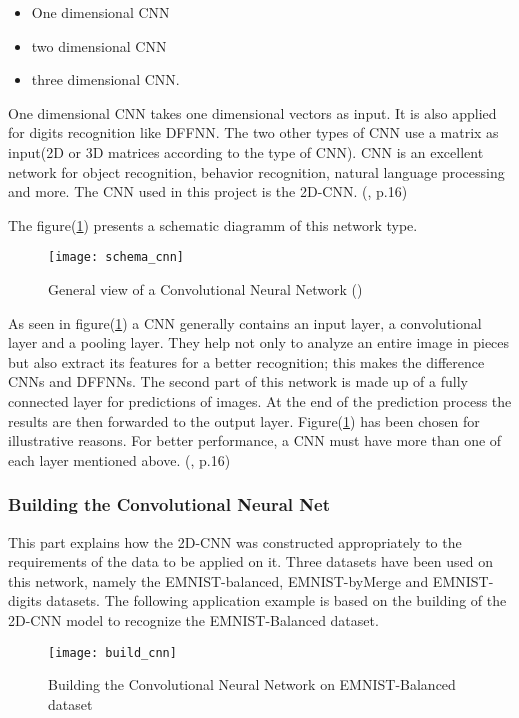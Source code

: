 \begin{itemize}
    \item One dimensional CNN
    \item two dimensional CNN
    \item three dimensional CNN.
  \end{itemize}

One dimensional CNN takes one dimensional vectors as input. 
It is also applied for digits recognition like DFFNN. The two other types of CNN use a matrix as input(2D or 3D matrices according to the type of CNN).
CNN is an excellent network for object recognition, behavior recognition, natural language processing and more. 
The CNN used in this project is the 2D-CNN. (\cite{[1]}, p.16)

The figure(\ref{Abb:schema_cnn}) presents a schematic diagramm of this network type.
\begin{figure}[htb]
	\centering
	\texttt{[image: schema\_cnn]}
	\caption[Convolutional Neural Network]{General view of a Convolutional Neural Network (\cite{[14]})} \label{Abb:schema_cnn}
\end{figure}

As seen in figure(\ref{Abb:schema_cnn}) a CNN generally contains an input layer, a convolutional layer and  a pooling layer. They help not only to 
analyze an entire image in pieces but also extract its features for a better recognition; this makes the difference CNNs and DFFNNs. 
The second part of this network is made up of a fully connected layer for predictions of images. At the end of the prediction process the 
results are then forwarded to the output layer.
Figure(\ref{Abb:schema_cnn}) has been chosen for illustrative reasons. 
For better performance, a CNN must have more than one of each layer mentioned above. (\cite{[1]}, p.16)

\subsubsection{Building the Convolutional Neural Net}
This part explains how the 2D-CNN was constructed appropriately to the requirements of the data to be applied on it. 
Three datasets have been used on this network, namely the EMNIST-balanced, EMNIST-byMerge and EMNIST-digits datasets. 
The following application example is based on the building of the 2D-CNN model to recognize the EMNIST-Balanced dataset.

\begin{figure}[htb]
	\centering
	\texttt{[image: build\_cnn]}
	\caption[Building Convolutional Neural Network]{Building the Convolutional Neural Network on EMNIST-Balanced dataset} \label{Abb:build_cnn}
\end{figure}

